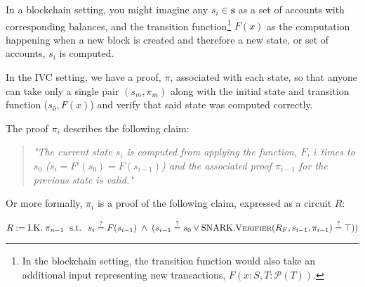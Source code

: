 \documentclass[
]{article}
\let\origfigure\figure
\let\endorigfigure\endfigure
\renewenvironment{figure}[1][2] {
    \expandafter\origfigure\expandafter[H]
} {
    \endorigfigure
}
\newcommand*\Pc{\mathcal{P}}
\newcommand*\meq{\stackrel{?}{=}}
\renewcommand{\vec}[1]{ \boldsymbol{#1} }
\newcommand*{\Prover}{\mathrm{\text{P\scriptsize ROVER}}}
\newcommand*{\Verifier}{\mathrm{\text{V\scriptsize ERIFIER}}}
\newcommand*{\SNARKProver}{\mathrm{\text{SNARK}}.\Prover}
\newcommand*{\SNARKVerifier}{\mathrm{\text{SNARK}}.\Verifier}
\begin{document}
In a blockchain setting, you might imagine any \(s_i \in \vec{s}\) as a
set of accounts with corresponding balances, and the transition
function\footnote{In the blockchain setting, the transition function
  would also take an additional input representing new transactions,
  \(F(x: S, T: \Pc(T))\).} \(F(x)\) as the computation happening when a
new block is created and therefore a new state, or set of accounts,
\(s_i\) is computed.

In the IVC setting, we have a proof, \(\pi\), associated with each
state, so that anyone can take only a single pair \((s_m, \pi_m)\) along
with the initial state and transition function (\(s_0, F(x)\)) and
verify that said state was computed correctly.

\begin{figure}[!H]
\centering
{}
\caption{
  A visualization of the relationship between $F, \vec{s}$ and $\vec{\pi}$
  in an IVC setting using traditional SNARKs. $\Pc(s_i, \pi_i)$ denotes
  $\SNARKProver(R_F, s_{i-1}, \pi_{i-1}) = (s_i, \pi_i)$ where $R_F$ is the
  transition function $F$ expressed as a circuit.
}
\end{figure}

The proof \(\pi_i\) describes the following claim:

\begin{quote}
\color{GbGrey}

\textit{"The current state $s_i$ is computed from applying the function,
$F$, $i$ times to $s_0$ ($s_i = F^i(s_0) = F(s_{i-1})$) and the associated
proof $\pi_{i-1}$ for the previous state is valid."}

\end{quote}

Or more formally, \(\pi_i\) is a proof of the following claim, expressed
as a circuit \(R\):

\[R := \text{I.K.} \; \pi_{n-1} \; \text{ s.t. } \; s_i \meq F(s_{i-1}) \; \land \; (s_{i-1} \meq s_0 \lor \SNARKVerifier(R_F, s_{i-1}, \pi_{i-1}) \meq \top))\]
\end{document}
